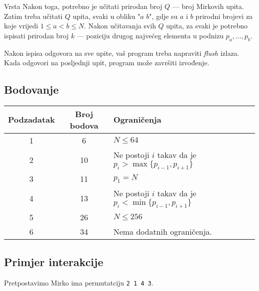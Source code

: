 \begin{statement}[
  problempoints=100,
  timelimit=1 sekunda,
  memorylimit=512 MiB,
]{Vrsta}
Nakon toga, potrebno je učitati prirodan broj $Q$ — broj Mirkovih upita. Zatim treba učitati $Q$ upita, svaki u obliku "$a$ $b$", gdje su $a$ i $b$ prirodni brojevi za koje vrijedi $1 \le a < b \le N$. Nakon učitavanja svih $Q$ upita, za svaki je potrebno ispisati prirodan broj $k$ — poziciju drugog najvećeg elementa u podnizu $p_a, \ldots, p_b$.

Nakon ispisa odgovora na sve upite, vaš program treba napraviti \textit{flush} izlaza. Kada odgovori na posljednji upit, program može završiti izvođenje.

\subsection*{Bodovanje}


{\renewcommand{\arraystretch}{1.4}
  \setlength{\tabcolsep}{6pt}
  \begin{tabular}{ccl}
   Podzadatak & Broj bodova & Ograničenja \\ \midrule
   	1 & 6 & $N \leq 64$ \\
    2 & 10 & Ne postoji $i$ takav da je $p_i > \max\{p_{i - 1}, p_{i + 1}\}$ \\
    3 & 11 & $p_1 = N$ \\
    4 & 13 & Ne postoji $i$ takav da je $p_i < \min\{p_{i - 1}, p_{i + 1}\}$ \\
    5 & 26 & $N \leq 256$ \\
    6 & 34 & Nema dodatnih ograničenja. \\
\end{tabular}}

\subsection*{Primjer interakcije}

Pretpostavimo Mirko ima permutatciju \texttt{2 1 4 3}.


\end{statement}
